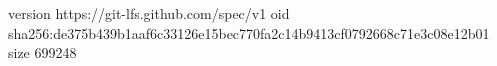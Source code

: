 version https://git-lfs.github.com/spec/v1
oid sha256:de375b439b1aaf6c33126e15bec770fa2c14b9413cf0792668c71e3c08e12b01
size 699248
